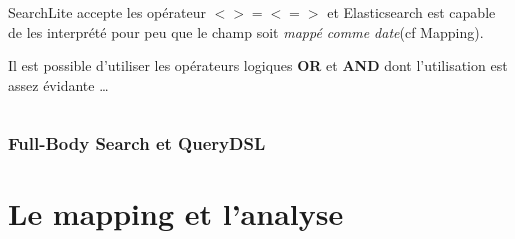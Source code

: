 SearchLite accepte les opérateur $< > =< =>$ et Elasticsearch est capable de les 
interprété pour peu que le champ soit \textit{mappé comme date}(cf Mapping).

Il est possible d'utiliser les opérateurs logiques \textbf{OR} et \textbf{AND} 
dont l'utilisation est assez évidante \ldots
\begin{lstlisting}[style=code,label={lst:APIsearchliteexample6},caption={Opérateurs logiques}]

\end{lstlisting}




\subsubsection{Full-Body Search et QueryDSL}

\section{Le mapping et l'analyse}

